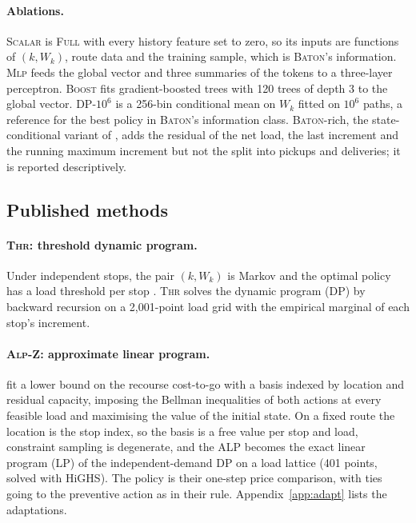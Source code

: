 \documentclass[trsc,dblanonrev]{informs4}
\newcommand{\Full}{\textsc{Full}}
\newcommand{\Scalar}{\textsc{Scalar}}
\newcommand{\Mlp}{\textsc{Mlp}}
\newcommand{\Boost}{\textsc{Boost}}
\newcommand{\Baton}{\textsc{Baton}}
\newcommand{\Thr}{\textsc{Thr}}
\newcommand{\Alpz}{\textsc{Alp-Z}}
\begin{document}
\paragraph{Ablations.} \Scalar{} is \Full{} with every history feature set to
zero, so its inputs are functions of $(k, W_k)$, route data and the training
sample, which is \Baton{}'s information. \Mlp{} feeds the global vector and
three summaries of the tokens to a three-layer perceptron. \Boost{} fits
gradient-boosted trees \citep{friedman2001greedy} with 120 trees of depth 3 to
the global vector. DP-$10^6$ is a 256-bin conditional mean on $W_k$ fitted on
$10^6$ paths, a reference for the best policy in \Baton{}'s information class.
\Baton{}-rich, the state-conditional variant of \citet{dang2026baton}, adds the
residual of the net load, the last increment and the running maximum increment
but not the split into pickups and deliveries; it is reported descriptively.

\subsection{Published methods}

\paragraph{\Thr{}: threshold dynamic program.} Under independent stops, the
pair $(k, W_k)$ is Markov and the optimal policy has a load threshold per stop
\citep{yang2000stochastic, venkateshan2026note}. \Thr{} solves the dynamic
program (DP) by backward recursion on a 2{,}001-point load grid with the
empirical marginal of each stop's increment.

\paragraph{\Alpz{}: approximate linear program.} \citet{zhu2026partial} fit a
lower bound on the recourse cost-to-go with a basis indexed by location and
residual capacity, imposing the Bellman inequalities of both actions at every
feasible load and maximising the value of the initial state. On a fixed route
the location is the stop index, so the basis is a free value per stop and load,
constraint sampling is degenerate, and the ALP becomes the exact linear program
(LP) of the independent-demand DP on a load lattice (401 points, solved with
HiGHS). The policy is their one-step price comparison, with ties going to the
preventive action as in their rule. Appendix~\ref{app:adapt} lists the
adaptations.
\end{document}
